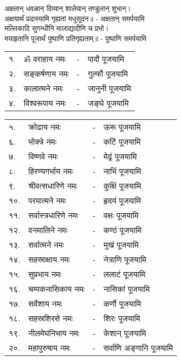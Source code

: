अक्षतान् धवळान् दिव्यान् शालेयान् तण्डुलान् शुभान्।\\
अक्षयार्थं प्रदास्यामि गृह्यतां मधुसूदन॥ - अक्षतान् समर्पयामि\\

मल्लिकादि सुगन्धीनि मालाद्यादीनि च प्रभो। \\
मयाहृतानि पूजार्थं पुष्पाणि प्रतिगृह्यताम्॥ - पुष्पाणि समर्पयामि

\begin{tabular}{llll}
१.&	ॐ वराहाय नमः &-& पादौ पूजयामि	\\
२.&	सङ्कर्षणाय नमः &-& गुल्फौ पूजयामि\\
३.&	कालात्मने नमः &-& जानुनी पूजयामि	\\
४.&	विश्वरूपाय नमः &-& जङ्घे पूजयामि\\
\end{tabular}

\begin{tabular}{llll}
५.&	क्रोढाय नमः &-& ऊरू पूजयामि	\\
६.&	भोक्त्रे नमः &-& कटिं पूजयामि	\\
७.&	विष्णवे नमः &-& मेढ्रं पूजयामि		\\
८.&	हिरण्यगर्भाय नमः &-& नाभिं पूजयामि\\
९.&	श्रीवत्सधारिणे नमः &-& कुक्षिं पूजयामि	\\
१०.& परमात्मने नमः &-& हृदयं पूजयामि\\
११.& सर्वास्त्रधारिणे नमः &-& वक्षः पूजयामि	\\
१२.& वनमालिने नमः &-& कण्ठं पूजयामि\\
१३.& सर्वात्मने नमः &-& मुखं पूजयामि	\\
१४.&	 सहस्राक्षाय नमः &-& नेत्राणि पूजयामि\\
१५.& सुप्रभाय नमः &-& ललाटं पूजयामि	\\
१६.& चम्पकनासिकाय नमः &-& नासिकां पूजयामि	\\
१७.& सर्वेशाय नमः &-& कर्णौ पूजयामि	\\
१८.& सहस्रशिरसे नमः &-& शिरः पूजयामि\\
१९.& नीलमेघनिभाय नमः &-& केशान् पूजयामि	\\
२०.& महापुरुषाय नमः &-& सर्वाणि अङ्गानि पूजयामि	\\
\end{tabular}

